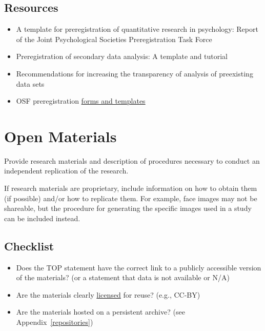 \documentclass[
  oneside]{book}
\providecommand{\tightlist}{%
  \setlength{\itemsep}{0pt}\setlength{\parskip}{0pt}}
\begin{document}
\hypertarget{resources-2}{%
\section{Resources}\label{resources-2}}

\begin{itemize}
\tightlist
\item
  A template for preregistration of quantitative research in psychology: Report of the Joint Psychological Societies Preregistration Task Force \citep{bosnjak2021template}
\item
  Preregistration of secondary data analysis: A template and tutorial \citep{van2021preregistration}
\item
  Recommendations for increasing the transparency of analysis of preexisting data sets \citep{weston2019recommendations}
\item
  OSF preregistration \href{https://osf.io/zab38/wiki/home/}{forms and templates}
\end{itemize}

\hypertarget{open-materials}{%
\chapter{Open Materials}\label{open-materials}}

Provide research materials and description of procedures necessary to conduct an independent replication of the research.

If research materials are proprietary, include information on how to obtain them (if possible) and/or how to replicate them. For example, face images may not be shareable, but the procedure for generating the specific images used in a study can be included instead.

\hypertarget{checklist-1}{%
\section{Checklist}\label{checklist-1}}

\begin{itemize}
\tightlist
\item
  Does the TOP statement have the correct link to a publicly accessible version of the materials? (or a statement that data is not available or N/A)
\item
  Are the materials clearly \href{https://www.ucl.ac.uk/library/research-support/research-data-management/licenses-data-sharing-creative-commons}{licensed} for reuse? (e.g., CC-BY)
\item
  Are the materials hosted on a persistent archive? (see Appendix~\ref{repositories})
\end{itemize}
\end{document}
